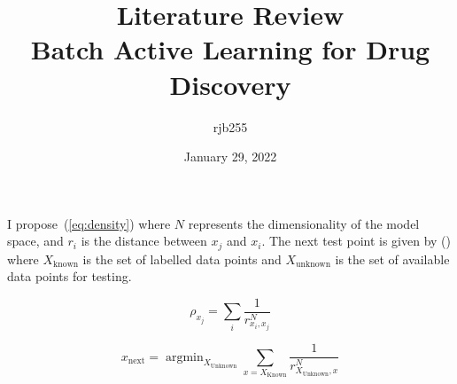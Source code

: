 \documentclass[a4paper, english]{article}
\DeclareMathOperator*{\argmin}{argmin}
\begin{document}
\title{\Large{\textbf{Literature Review}}\\Batch Active Learning for Drug Discovery}
\author{rjb255}
\date{January 29, 2022}

\maketitle

\begin{abstract}
    \blindtext[1]{}
\end{abstract}



I propose~(\ref{eq:density}) where $N$ represents the dimensionality of the model space, and $r_i$ is the distance between $x_j$ and $x_i$. The next test point is given by () where $X_\mathrm{known}$ is the set of labelled data points and $X_\mathrm{unknown}$ is the set of available data points for testing.

\begin{equation}
    \label{eq:density}
    \rho_{x_j}=\sum_i{\frac{1}{r_{x_i,x_j}^N}}
\end{equation}

\begin{equation}
    x_\mathrm{next}=\argmin_{X_\mathrm{Unknown}}{\sum_{x=X_\mathrm{Known}}{\frac{1}{r_{X_\mathrm{Unknown},x}^N}}}
\end{equation}
\end{document}
